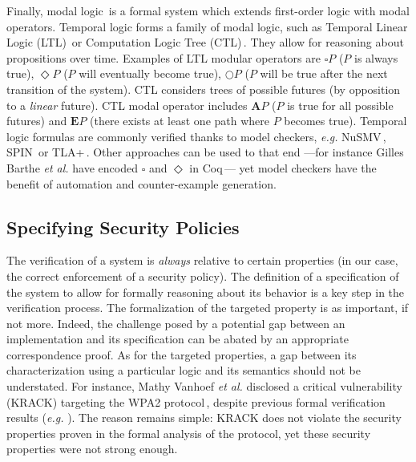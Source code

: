 Finally, modal logic\,\cite{chagrov1997modal} is a formal system which extends
first-order logic with modal operators.
%
Temporal logic forms a family of modal logic, such as Temporal Linear Logic
(LTL)\,\cite{sistla1985ltl} or Computation Logic Tree
(CTL)\,\cite{clarke1981ctl}.
%
They allow for reasoning about propositions over time.
%
Examples of LTL modular operators are \( \square P \) (\( P \) is always true),
\( \Diamond P \) (\( P \) will eventually become true), \( \bigcirc P \)
(\( P \) will be true after the next transition of the system).
%
CTL considers trees of possible futures (by opposition to a \emph{linear}
future).
%
CTL modal operator includes \( \mathbf{A} P \) (\( P \) is true for all possible
futures) and \( \mathbf{E} P \) (there exists at least one path where \( P \)
becomes true).
%
Temporal logic formulas are commonly verified thanks to model checkers,
\emph{e.g.}  NuSMV\,\cite{cimatti2002nusmv}, SPIN\,\cite{holzmann1997spin} or
TLA+\,\cite{lamport2002tla}.
%
Other approaches can be used to that end ---for instance Gilles Barthe \emph{et
  al.} have encoded \( \square \) and \( \Diamond \) in
Coq\,\cite{barthe2011virtcert1}--- yet model checkers have the benefit of
automation and counter-example generation.

\subsection{Specifying Security Policies}
\label{sec:sota:security}

The verification of a system is \emph{always} relative to certain properties (in
our case, the correct enforcement of a security policy).
%
The definition of a specification of the system to allow for formally reasoning
about its behavior is a key step in the verification process.
%
The formalization of the targeted property is as important, if not more.
%
Indeed, the challenge posed by a potential gap between an implementation and its
specification can be abated by an appropriate correspondence proof.
%
As for the targeted properties, a gap between its characterization using a
particular logic and its semantics should not be understated.
%
For instance, Mathy Vanhoef \emph{et al.} disclosed a critical vulnerability
(KRACK) targeting the WPA2 protocol\,\cite{vanhoef2017key}, despite previous
formal verification results (\emph{e.g.} \cite{he2004analysis}).
%
The reason remains simple: KRACK does not violate the security properties proven
in the formal analysis of the protocol, yet these security properties were not
strong enough.

